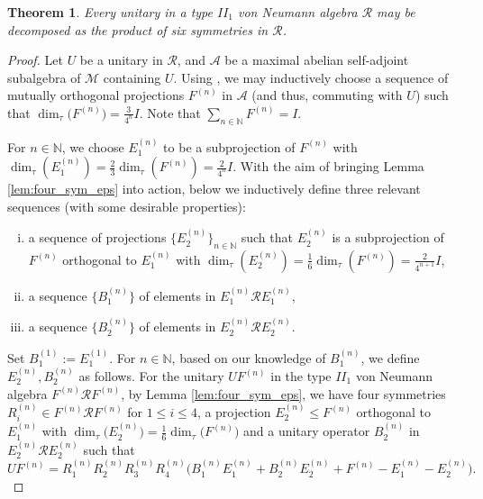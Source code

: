 \documentclass[12pt, preprint]{amsart}
\newtheorem{thm}{Theorem}[section]
\newcommand{\N}{\mathbb{N}}
\theoremstyle{definition}
\theoremstyle{remark}
\numberwithin{equation}{section}
\theoremstyle{ser}
\theoremstyle{serr}
\theoremstyle{ser}
\begin{document}
\begin{thm}
\label{thm:mainthm2}
\textsl{
Every unitary in a type $II_1$ von Neumann algebra $\mathscr{R}$ may be decomposed as the product of six symmetries in $\mathscr{R}$.
}
\end{thm}
\begin{proof}
Let $U$ be a unitary in $\mathscr{R}$, and $\mathscr{A}$ be a maximal abelian self-adjoint subalgebra of $\mathscr{M}$ containing $U$. Using \cite[Proposition 3.13, Corollary 3.14]{diag_kadison}, we may inductively choose a sequence of mutually orthogonal projections $F^{(n)}$ in $\mathscr{A}$ (and thus, commuting with $U$) such that $\dim _{\tau} \big( F^{(n)} \big) = \frac{3}{4^n} I.$ Note that $\sum_{n \in \N} F^{(n)} = I$.

For $n \in \N$, we choose $E_1 ^{(n)}$ to be a subprojection of $F^{(n)}$ with $\dim _{\tau} (E_1 ^{(n)}) = \frac{2}{3} \dim _{\tau} (F^{(n)}) = \frac{2}{4^n}I$. With the aim of bringing Lemma \ref{lem:four_sym_eps} into action, below we inductively define three relevant sequences (with some desirable properties):
\begin{enumerate}[(i)]
    \item a sequence of projections $\{ E_2 ^{(n)} \}_{n \in \N}$ such that $E_2 ^{(n)}$ is a subprojection of $F^{(n)}$ orthogonal to $E_1 ^{(n)}$ with $\dim _{\tau} (E_2 ^{(n)}) = \frac{1}{6} \dim _{\tau} (F^{(n)}) = \frac{2}{4^{n+1}} I$,
    \item a sequence $\{ B_1 ^{(n)}\}$ of elements in $E_1 ^{(n)} \mathscr{R} E_1^{(n)}$,
    \item a sequence $\{ B_2 ^{(n)} \}$ of elements in $E_2 ^{(n)} \mathscr{R} E_2 ^{(n)}$.
\end{enumerate}

Set $B_1 ^{(1)} := E_1 ^{(1)}.$ For $n \in \N$, based on our knowledge of $B_1 ^{(n)}$, we define $E_2 ^{(n)}, B_2 ^{(n)}$ as follows. For the unitary $UF^{(n)}$ in the type $II_1$ von Neumann algebra $F^{(n)} \mathscr{R} F^{(n)}$, by Lemma \ref{lem:four_sym_eps}, we have four symmetries $R_i^{(n)} \in F^{(n)} \mathscr{R} F^{(n)}$ for $1 \le i \le 4$, a projection $E_2 ^{(n)} \le F^{(n)}$ orthogonal to $E_1 ^{(n)}$ with $\dim _{\tau} \big( E_2 ^{(n)} \big) = \frac{1}{6} \dim _{\tau} \big( F^{(n)} \big)$ and a unitary operator $B_2^{(n)}$ in $E_2^{(n)} \mathscr{R} E_2^{(n)}$ such that 
$$UF^{(n)} = R_1^{(n)} R_2^{(n)} R_3^{(n)} R_4^{(n)} \big( B_1 ^{(n)} E_1^{(n)} + B_2^{(n)}E_2^{(n)} + F^{(n)} - E_1^{(n)} - E_2^{(n)}\big).$$



\end{proof}
\end{document}
